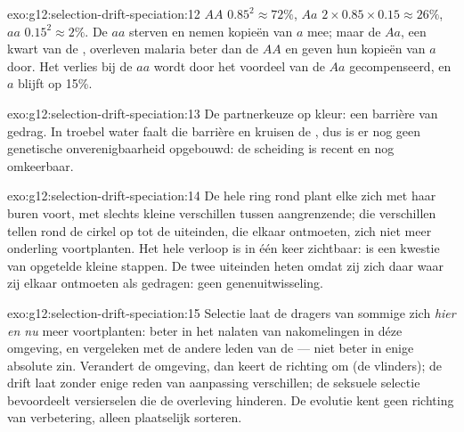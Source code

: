 \begin{solution}{exo:g12:selection-drift-speciation:12}
$AA$ $0.85^2 \approx 72\%$, $Aa$ $2 \times 0.85 \times 0.15 \approx
26\%$, $aa$ $0.15^2 \approx 2\%$. De $aa$ sterven en nemen kopieën van
$a$ mee; maar de $Aa$, een kwart van de , overleven malaria beter
dan de $AA$ en geven hun kopieën van $a$ door. Het verlies bij de $aa$
wordt door het voordeel van de $Aa$ gecompenseerd, en $a$ blijft op 15\%.
\end{solution}

\begin{solution}{exo:g12:selection-drift-speciation:13}
De partnerkeuze op kleur: een barrière van gedrag. In troebel water faalt
die barrière en kruisen de , dus is er nog geen genetische
onverenigbaarheid opgebouwd: de scheiding is recent en nog omkeerbaar.
\end{solution}

\begin{solution}{exo:g12:selection-drift-speciation:14}
De hele ring rond plant elke  zich met haar buren voort, met
slechts kleine verschillen tussen aangrenzende; die verschillen tellen
rond de cirkel op tot de uiteinden, die elkaar ontmoeten, zich niet meer
onderling voortplanten. Het hele verloop is in één keer zichtbaar:
 is een kwestie van opgetelde kleine stappen. De twee
uiteinden heten  omdat zij zich daar waar zij elkaar ontmoeten als
 gedragen: geen genenuitwisseling.
\end{solution}

\begin{solution}{exo:g12:selection-drift-speciation:15}
Selectie laat de dragers van sommige  zich \emph{hier en nu} meer
voortplanten: beter in het nalaten van nakomelingen in déze omgeving, en
vergeleken met de andere leden van de  --- niet beter in enige
absolute zin. Verandert de omgeving, dan keert de richting om (de
vlinders); de drift laat  zonder enige reden van aanpassing
verschillen; de seksuele selectie bevoordeelt versierselen die de
overleving hinderen. De evolutie kent geen richting van verbetering,
alleen plaatselijk sorteren.
\end{solution}

